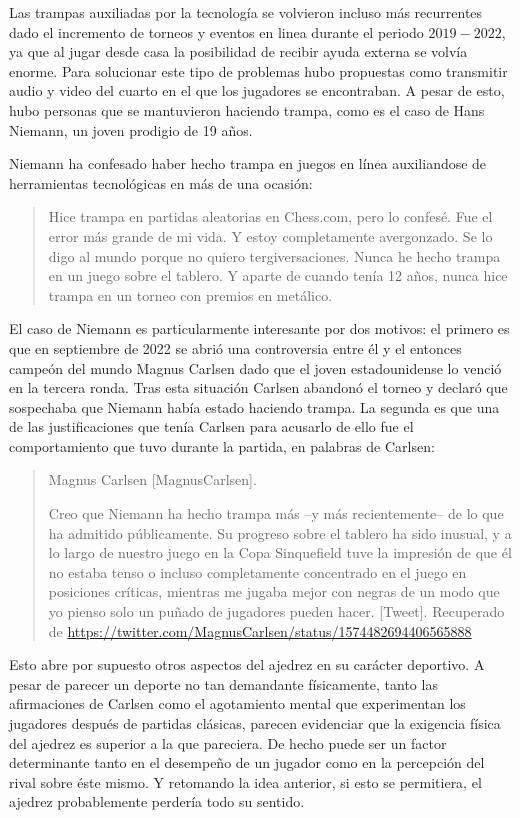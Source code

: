 \documentclass[twoside,openright,12pt,a4paper,spanish]{book}
\begin{document}
Las trampas auxiliadas por la tecnolog\'ia se volvieron incluso m\'as recurrentes dado el incremento de torneos y eventos en linea durante el periodo $2019 - 2022$, ya que al jugar desde casa la posibilidad de recibir ayuda externa se volv\'ia enorme. Para solucionar este tipo de problemas hubo propuestas como transmitir audio y video del cuarto en el que los jugadores se encontraban. A pesar de esto, hubo personas que se mantuvieron haciendo trampa, como es el caso de Hans Niemann, un joven prodigio de 19 años.

Niemann ha confesado haber hecho trampa en juegos en línea auxiliandose de herramientas tecnológicas en más de una ocasión:

\begin{quote} \singlespace
    Hice trampa en partidas aleatorias en Chess.com, pero lo confesé. Fue el error más grande de mi vida. Y estoy completamente avergonzado. Se lo digo al mundo porque no quiero tergiversaciones. Nunca he hecho trampa en un juego sobre el tablero. Y aparte de cuando tenía 12 años, nunca hice trampa en un torneo con premios en metálico. \cite{marca_niemann_trampa}
\end{quote}

El caso de Niemann es particularmente interesante por dos motivos: el primero es que en septiembre de 2022 se abrió una controversia entre él y el entonces campeón del mundo Magnus Carlsen dado que el joven estadounidense lo venció en la tercera ronda. Tras esta situación Carlsen abandonó el torneo y declaró que sospechaba que Niemann había estado haciendo trampa. La segunda es que una de las justificaciones que tenía Carlsen para acusarlo de ello fue el comportamiento que tuvo durante la partida, en palabras de Carlsen: 

\begin{quote}\singlespace
    Magnus Carlsen [MagnusCarlsen]. \citeyear{comunicado_carlsen}
    
    Creo que Niemann ha hecho trampa más --y más recientemente-- de lo que ha admitido públicamente. Su progreso sobre el tablero ha sido inusual, y a lo largo de nuestro juego en la Copa Sinquefield tuve la impresión de que él no estaba tenso o incluso completamente concentrado en el juego en posiciones críticas, mientras me jugaba mejor con negras de un modo que yo pienso solo un puñado de jugadores pueden hacer. [Tweet]. Recuperado de \url{https://twitter.com/MagnusCarlsen/status/1574482694406565888}
\end{quote}

Esto abre por supuesto otros aspectos del ajedrez en su carácter deportivo. A pesar de parecer un deporte no tan demandante físicamente, tanto las afirmaciones de Carlsen como el agotamiento mental que experimentan los jugadores después de partidas clásicas, parecen evidenciar que la exigencia física del ajedrez es superior a la que pareciera. De hecho puede ser un factor determinante tanto en el desempeño de un jugador como en la percepción del rival sobre éste mismo. Y retomando la idea anterior, si esto se permitiera, el ajedrez probablemente perder\'ia todo su sentido. 
\end{document}
